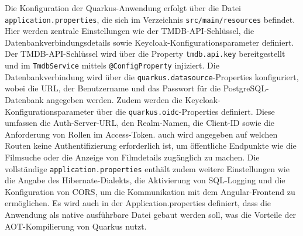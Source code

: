 Die Konfiguration der Quarkus-Anwendung erfolgt über die Datei \texttt{application.properties}, die sich im Verzeichnis \texttt{src/main/resources} befindet. 
Hier werden zentrale Einstellungen wie der TMDB-API-Schlüssel, die Datenbankverbindungsdetails sowie Keycloak-Konfigurationsparameter definiert.
Der TMDB-API-Schlüssel wird über die Property \texttt{tmdb.api.key} bereitgestellt und im \texttt{TmdbService} mittels \texttt{@ConfigProperty} injiziert.
Die Datenbankverbindung wird über die \texttt{quarkus.datasource}-Properties konfiguriert, wobei die URL, der Benutzername und das Passwort für die PostgreSQL-Datenbank angegeben werden.
Zudem werden die Keycloak-Konfigurationsparameter über die \texttt{quarkus.oidc}-Properties definiert. 
Diese umfassen die Auth-Server-URL, den Realm-Namen, die Client-ID sowie die Anforderung von Rollen im Access-Token. 
auch wird angegeben auf welchen Routen keine Authentifizierung erforderlich ist, um öffentliche Endpunkte wie die Filmsuche oder die Anzeige von Filmdetails zugänglich zu machen.
Die vollständige \texttt{application.properties} enthält zudem weitere Einstellungen wie die Angabe des Hibernate-Dialekts, die Aktivierung von SQL-Logging und die Konfiguration von CORS, um die Kommunikation mit dem Angular-Frontend zu ermöglichen. 
Es wird auch in der Application.properties definiert, dass die Anwendung als native ausführbare Datei gebaut werden soll, was die Vorteile der AOT-Kompilierung von Quarkus nutzt.
